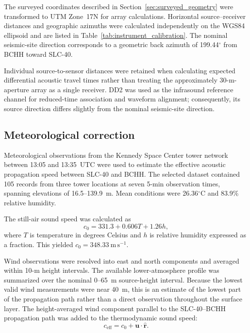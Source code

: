 \documentclass[]{seismica}
\begin{document}
The surveyed coordinates described in
Section~\ref{sec:surveyed_geometry} were transformed
to UTM Zone~17N for array calculations. Horizontal source--receiver distances
and geographic azimuths were calculated independently on the WGS84 ellipsoid
and are listed in Table~\ref{tab:instrument_calibration}. The nominal
seismic-site direction corresponds to a geometric back azimuth of
199.44$^\circ$ from BCHH toward SLC-40.

Individual source-to-sensor distances were retained when calculating expected
differential acoustic travel times rather than treating the approximately
30-m-aperture array as a single receiver. DD2 was used as the infrasound
reference channel for reduced-time association and waveform alignment;
consequently, its source direction differs slightly from the nominal
seismic-site direction.

\subsection{Meteorological correction}

Meteorological observations from the Kennedy Space Center tower network between
13:05 and 13:35~UTC were used to estimate the effective acoustic propagation
speed between SLC-40 and BCHH. The selected dataset contained 105 records from
three tower locations at seven 5-min observation times, spanning elevations of
16.5--139.9~m. Mean conditions were 26.36$^\circ$C and 83.9\% relative
humidity.

The still-air sound speed was calculated as
\begin{equation}
  c_0 = 331.3 + 0.606T + 1.26h,
  \label{eq:sound_speed}
\end{equation}
where $T$ is temperature in degrees Celsius and $h$ is relative humidity
expressed as a fraction. This yielded
$c_0=348.33~\mathrm{m\,s^{-1}}$.

Wind observations were resolved into east and north components and averaged
within 10-m height intervals. The available lower-atmosphere profile was
summarized over the nominal 0--65~m source-height interval. Because the lowest
valid wind measurements were near 40~m, this is an estimate of the lowest part
of the propagation path rather than a direct observation throughout the
surface layer. The height-averaged wind component parallel to the
SLC-40--BCHH propagation path was added to the thermodynamic sound speed:
\begin{equation}
  c_{\mathrm{eff}} =
  c_0 + \mathbf{u}\cdot\hat{\mathbf{r}}.
  \label{eq:effective_speed}
\end{equation}
\end{document}
